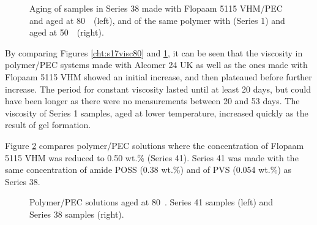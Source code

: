 \begin{figure}[h]
    \centering
    \caption{Aging of samples in Series 38 made with Flopaam 5115 VHM/PEC and aged at 80~\celsius~(left), and of the same polymer with  (Series 1) and aged at 50~\celsius~(right).}
    \label{cht:s38visc80}
\end{figure}

By comparing Figures \ref{cht:s17visc80} and \ref{cht:s38visc80}, it can be seen that the viscosity in polymer/PEC systems made with Alcomer 24 UK as well as the ones made with Flopaam 5115 VHM showed an initial increase, and then plateaued before further increase. The period for constant viscosity lasted until at least 20 days, but could have been longer as there were no measurements between 20 and 53 days. The viscosity of Series 1 samples, aged at lower temperature, increased quickly as the result of gel formation.

Figure \ref{cht:s41visc80} compares polymer/PEC solutions where the concentration of Flopaam 5115 VHM was reduced to 0.50 wt.\% (Series 41). Series 41 was made with the same concentration of amide POSS (0.38 wt.\%) and of PVS (0.054 wt.\%) as Series 38. 

\begin{figure}
    \centering
    \caption{Polymer/PEC solutions aged at 80~\celsius. Series 41 samples (left) and Series 38 samples (right).}
    \label{cht:s41visc80}
\end{figure}

